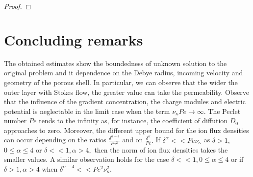 \documentclass{amsart}
\begin{document}
\begin{proof}
\end{proof}

\section{Concluding remarks}
The obtained estimates show the boundedness of unknown solution to the original problem and it dependence on the Debye radius, incoming velocity and geometry of the porous shell. 
In particular, we can observe that the wider the outer layer with Stokes flow, the greater value can take the permeability. Observe that the influence of the gradient concentration, the charge modules and electric potential is neglectable in the limit case when the term $\nu_{\kappa}Pe\rightarrow \infty.$  The Peclet number $Pe$ tends to the infinity as, for instance, the coefficient of diffution $D_0$ approaches to zero. 
Moreover, the different upper bound for the ion flux densities can occur depending on the ratios $\frac{\delta^{\alpha-4}}{Pe^2}$ and on $\frac{\delta^{\alpha}}{Pe}.$ If $\delta^{\alpha}<<Pe\nu_{\kappa}$ as $\delta>1,$  $0\leq \alpha\leq 4$  or  $\delta<<1, \alpha> 4, $ then the norm of ion flux densities  takes the smaller values. A similar observation holds 
for  the case $\delta<<1,0\leq \alpha\leq 4$ or if $\delta>1, \alpha > 4$ when $\delta^{\alpha-4}<<Pe^2\nu^2_{\kappa}.$
\end{document}
